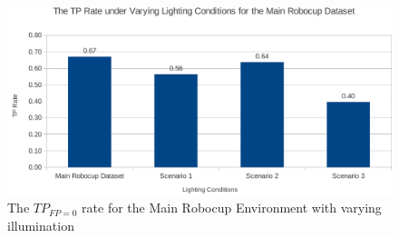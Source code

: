 \documentclass[11pt]{report}
\begin{document}

\begin{figure}[h!] 
  \centering
    \includegraphics[width=1.0\textwidth]{../Drawings/Graphs/tp_rate_lighting.pdf}
    \caption{The $TP_{FP=0}$ rate for the Main Robocup Environment with varying illumination}
    \label{fig:tp_rate_lighting}
\end{figure}

\end{document}

